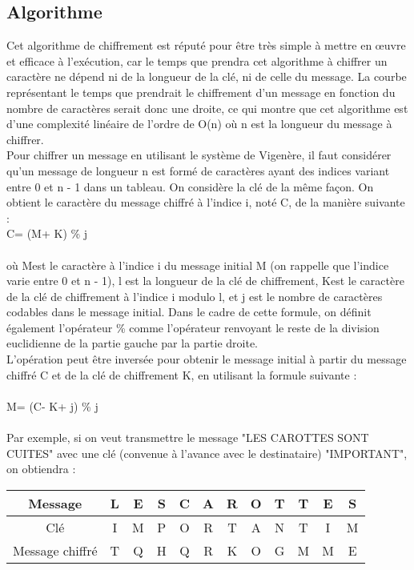 		\subsection{Algorithme}
			Cet algorithme de chiffrement est réputé pour être très simple à mettre en \oe{uvre} et efficace à l'exécution, car le temps que prendra cet algorithme à chiffrer un caractère ne dépend ni de la longueur de la clé, ni de celle du message. La courbe représentant le temps que prendrait le chiffrement d'un message en fonction du nombre de caractères serait donc une droite, ce qui montre que cet algorithme est d'une complexité linéaire de l'ordre de O(n) où n est la longueur du message à chiffrer.\\
			Pour chiffrer un message en utilisant le système de Vigenère, il faut considérer qu'un message de longueur n est formé de caractères ayant des indices variant entre 0 et n - 1 dans un tableau. On considère la clé de la même façon. On obtient le caractère du message chiffré à l'indice i, noté C\rbrack, de la manière suivante :\linebreak
			\\
			C\rbrack = (M\rbrack + K\rbrack) \% j\\
			\\
			où M\rbrack est le caractère à l'indice i du message initial M (on rappelle que l'indice varie entre 0 et n - 1), l est la longueur de la clé de chiffrement, K\rbrack est le caractère de la clé de chiffrement à l'indice i modulo l, et j est le nombre de caractères codables dans le message initial. Dans le cadre de cette formule, on définit également l'opérateur \% comme l'opérateur renvoyant le reste de la division euclidienne de la partie gauche par la partie droite.\\
			L'opération peut être inversée pour obtenir le message initial à partir du message chiffré C et de la clé de chiffrement K, en utilisant la formule suivante :\\
			\\
			M\rbrack = (C\rbrack - K\rbrack + j) \% j\\
			\\
			Par exemple, si on veut transmettre le message "LES CAROTTES SONT CUITES" avec une clé (convenue à l'avance avec le destinataire) "IMPORTANT", on obtiendra :\\
			\begin{tabular}{ | c | c | c | c | c | c | c | c | c | c | c | c | }
				\hline
				Message & L&E&S&C&A&R&O&T&T&E&S \\ \hline
				Clé & I&M&P&O&R&T&A&N&T&I&M \\ \hline
				Message chiffré & T&Q&H&Q&R&K&O&G&M&M&E \\
				\hline
			\end{tabular}\\
